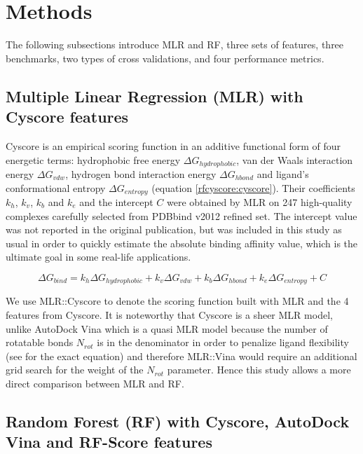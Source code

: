 \section{Methods}

The following subsections introduce MLR and RF, three sets of features, three benchmarks, two types of cross validations, and four performance metrics.

\subsection{Multiple Linear Regression (MLR) with Cyscore features}

Cyscore is an empirical scoring function in an additive functional form of four energetic terms: hydrophobic free energy $\Delta G_{hydrophobic}$, van der Waals interaction energy $\Delta G_{vdw}$, hydrogen bond interaction energy $\Delta G_{hbond}$ and ligand's conformational entropy $\Delta G_{entropy}$ (equation \eqref{rfcyscore:cyscore}). Their coefficients $k_h$, $k_v$, $k_b$ and $k_e$ and the intercept $C$ were obtained by MLR on 247 high-quality complexes carefully selected from PDBbind v2012 refined set. The intercept value was not reported in the original publication, but was included in this study as usual \citep{1313} in order to quickly estimate the absolute binding affinity value, which is the ultimate goal in some real-life applications.

\begin{equation}
\Delta G_{bind} = k_h\Delta G_{hydrophobic} + k_v\Delta G_{vdw} + k_b\Delta G_{hbond} + k_e\Delta G_{entropy} + C
\label{rfcyscore:cyscore}
\end{equation}

We use MLR::Cyscore to denote the scoring function built with MLR and the 4 features from Cyscore. It is noteworthy that Cyscore is a sheer MLR model, unlike AutoDock Vina \citep{595} which is a quasi MLR model because the number of rotatable bonds $N_{rot}$ is in the denominator in order to penalize ligand flexibility (see \citep{1362} for the exact equation) and therefore MLR::Vina would require an additional grid search for the weight of the $N_{rot}$ parameter. Hence this study allows a more direct comparison between MLR and RF.

\subsection{Random Forest (RF) with Cyscore, AutoDock Vina and RF-Score features}

